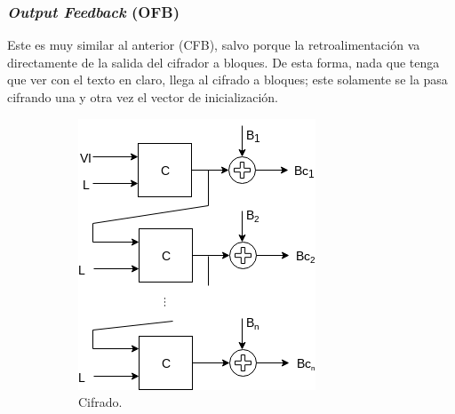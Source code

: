 %
%

\subsubsection{\textit{Output Feedback} (OFB)}

Este es muy similar al anterior (CFB), salvo porque la retroalimentación va
directamente de la salida del cifrador a bloques. De esta forma, nada que
tenga que ver con el texto en claro, llega al cifrado a bloques; este
solamente se la pasa cifrando una y otra vez el vector de inicialización.

\vspace{0.5cm}

\begin{figure}[H]
  \centering
  \begin{subfigure}{0.45\textwidth}
      \begin{center}
          \includegraphics[width=0.7\linewidth]
            {contenidos/antecedentes/bloques/modos/diagramas/modo_ofb.png}
          \caption{Cifrado.}
      \end{center}
  \end{subfigure}
  \begin{subfigure}{0.45\textwidth}
      \begin{center}

\end{center}
\end{subfigure}
\end{figure}

